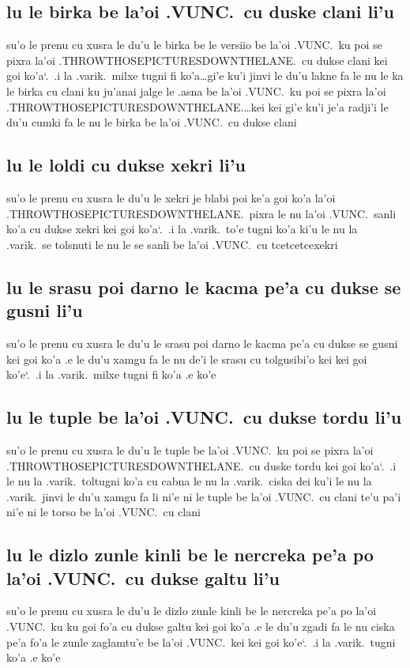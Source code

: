 \documentclass{report}
\newcommand\sds{\spacefactor\sfcode`.\ \space}
\begin{document}
\subsection{lu le birka be la'oi .VUNC.\ cu duske clani li'u}
su'o le prenu cu xusra le du'u le birka be le versiio be la'oi .VUNC.\ ku poi se pixra la'oi .THROWTHOSEPICTURESDOWNTHELANE.\ cu dukse clani kei goi ko'a\sds  .i la .varik.\ milxe tugni fi ko'a\ldots gi'e ku'i jinvi le du'u lakne fa le nu le ka le birka cu clani ku ju'anai jalge le .asna be la'oi .VUNC.\ ku poi se pixra la'oi .THROWTHOSEPICTURESDOWNTHELANE.\ldots kei kei gi'e ku'i je'a radji'i le du'u cumki fa le nu le birka be la'oi .VUNC.\ cu dukse clani

\subsection{lu le loldi cu dukse xekri li'u}
su'o le prenu cu xusra le du'u le xekri je blabi poi ke'a goi ko'a la'oi .THROWTHOSEPICTURESDOWNTHELANE.\ pixra le nu la'oi .VUNC.\ sanli ko'a cu dukse xekri kei goi ko'a\sds  .i la .varik.\ to'e tugni ko'a ki'u le nu la .varik.\ se tolsnuti le nu le se sanli be la'oi .VUNC.\ cu tcetcetcexekri

\subsection{lu le srasu poi darno le kacma pe'a cu dukse se gusni li'u}
su'o le prenu cu xusra le du'u le srasu poi darno le kacma pe'a cu dukse se gusni kei goi ko'a .e le du'u xamgu fa le nu de'i le srasu cu tolgusibi'o kei kei goi ko'e\sds  .i la .varik.\ milxe tugni fi ko'a .e ko'e

\subsection{lu le tuple be la'oi .VUNC.\ cu dukse tordu li'u}
su'o le prenu cu xusra le du'u le tuple be la'oi .VUNC.\ ku poi se pixra la'oi .THROWTHOSEPICTURESDOWNTHELANE.\ cu duske tordu kei goi ko'a\sds  .i le nu la .varik.\ toltugni ko'a cu cabna le nu la .varik.\ ciska dei ku'i le nu la .varik.\ jinvi  le du'u xamgu fa li ni'e ni le tuple be la'oi .VUNC.\ cu clani te'u pa'i ni'e ni le torso be la'oi .VUNC.\ cu clani

\subsection{lu le dizlo zunle kinli be le nercreka pe'a po la'oi .VUNC.\ cu dukse galtu li'u}
su'o le prenu cu xusra le du'u le dizlo zunle kinli be le nercreka pe'a po la'oi .VUNC.\ ku ku goi fo'a cu dukse galtu kei goi ko'a .e le du'u zgadi fa le nu ciska pe'a fo'a le zunle zaglamtu'e be la'oi .VUNC.\ kei kei goi ko'e\sds  .i la .varik.\ tugni ko'a .e ko'e
\end{document}
